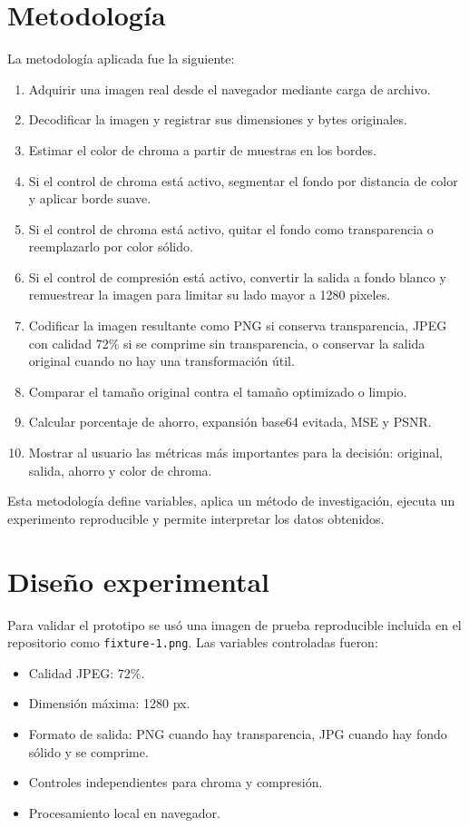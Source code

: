 \documentclass[12pt,letterpaper]{article}
\begin{document}
\section{Metodología}
La metodología aplicada fue la siguiente:
\begin{enumerate}
  \item Adquirir una imagen real desde el navegador mediante carga de archivo.
  \item Decodificar la imagen y registrar sus dimensiones y bytes originales.
  \item Estimar el color de chroma a partir de muestras en los bordes.
  \item Si el control de chroma está activo, segmentar el fondo por distancia de color y aplicar borde suave.
  \item Si el control de chroma está activo, quitar el fondo como transparencia o reemplazarlo por color sólido.
  \item Si el control de compresión está activo, convertir la salida a fondo blanco y remuestrear la imagen para limitar su lado mayor a 1280 pixeles.
  \item Codificar la imagen resultante como PNG si conserva transparencia, JPEG con calidad 72\% si se comprime sin transparencia, o conservar la salida original cuando no hay una transformación útil.
  \item Comparar el tamaño original contra el tamaño optimizado o limpio.
  \item Calcular porcentaje de ahorro, expansión base64 evitada, MSE y PSNR.
  \item Mostrar al usuario las métricas más importantes para la decisión: original, salida, ahorro y color de chroma.
\end{enumerate}

Esta metodología define variables, aplica un método de investigación, ejecuta un experimento reproducible y permite interpretar los datos obtenidos.

\section{Diseño experimental}
Para validar el prototipo se usó una imagen de prueba reproducible incluida en el repositorio como \texttt{fixture-1.png}. Las variables controladas fueron:

\begin{itemize}
  \item Calidad JPEG: 72\%.
  \item Dimensión máxima: 1280 px.
  \item Formato de salida: PNG cuando hay transparencia, JPG cuando hay fondo sólido y se comprime.
  \item Controles independientes para chroma y compresión.
  \item Procesamiento local en navegador.
\end{itemize}
\end{document}
